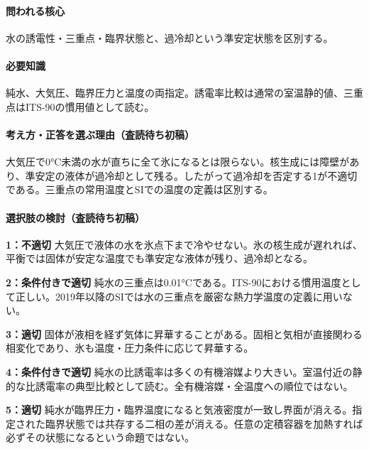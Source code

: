 \paragraph{問われる核心} 水の誘電性・三重点・臨界状態と、過冷却という準安定状態を区別する。

\paragraph{必要知識} 純水、大気圧、臨界圧力と温度の両指定。誘電率比較は通常の室温静的値、三重点はITS-90の慣用値として読む。

\paragraph{考え方・正答を選ぶ理由（査読待ち初稿）} 大気圧で0°C未満の水が直ちに全て氷になるとは限らない。核生成には障壁があり、準安定の液体が過冷却として残る。したがって過冷却を否定する1が不適切である。三重点の常用温度とSIでの温度の定義は区別する。

\paragraph{選択肢の検討（査読待ち初稿）}\mbox{}\par

\noindent\textbf{1：不適切} 大気圧で液体の水を氷点下まで冷やせない。氷の核生成が遅れれば、平衡では固体が安定な温度でも準安定な液体が残り、過冷却となる。\par

\noindent\textbf{2：条件付きで適切} 純水の三重点は0.01°Cである。ITS-90における慣用温度として正しい。2019年以降のSIでは水の三重点を厳密な熱力学温度の定義に用いない。\par

\noindent\textbf{3：適切} 固体が液相を経ず気体に昇華することがある。固相と気相が直接関わる相変化であり、氷も温度・圧力条件に応じて昇華する。\par

\noindent\textbf{4：条件付きで適切} 純水の比誘電率は多くの有機溶媒より大きい。室温付近の静的な比誘電率の典型比較として読む。全有機溶媒・全温度への順位ではない。\par

\noindent\textbf{5：適切} 純水が臨界圧力・臨界温度になると気液密度が一致し界面が消える。指定された臨界状態では共存する二相の差が消える。任意の定積容器を加熱すれば必ずその状態になるという命題ではない。\par

